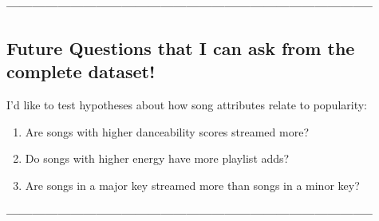 \documentclass[
]{article}
\begin{document}
\textbf{--------------------------------------------------------------------------------------}

\hypertarget{future-questions-that-i-can-ask-from-the-complete-dataset}{%
\subsection{Future Questions that I can ask from the complete
dataset!}\label{future-questions-that-i-can-ask-from-the-complete-dataset}}

I'd like to test hypotheses about how song attributes relate to
popularity:

\begin{enumerate}
\def\labelenumi{\arabic{enumi}.}
\item
  Are songs with higher danceability scores streamed more?
\item
  Do songs with higher energy have more playlist adds?
\item
  Are songs in a major key streamed more than songs in a minor key?
\end{enumerate}

\textbf{--------------------------------------------------------------------------------------}
\end{document}
